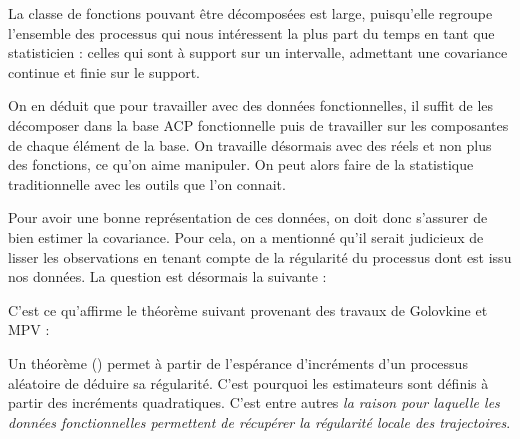 \begin{rem}
	La classe de fonctions pouvant être décomposées est large, puisqu'elle regroupe l'ensemble des processus qui nous intéressent la plus part du temps en tant que statisticien : celles qui sont à support sur un intervalle, admettant une covariance continue et finie sur le support.
\end{rem}

On en déduit que pour travailler avec des données fonctionnelles, il suffit de les décomposer dans la base ACP fonctionnelle puis de travailler sur les composantes de chaque élément de la base. On travaille désormais avec des réels et non plus des fonctions, ce qu'on aime manipuler. On peut alors faire de la statistique traditionnelle avec les outils que l'on connait.


\begin{propriete*}
	\noindent{}
\end{propriete*}

Pour avoir une bonne représentation de ces données, on doit donc s'assurer de bien estimer la covariance. Pour cela, on a mentionné qu'il serait judicieux de lisser les observations en tenant compte de la régularité du processus dont est issu nos données. La question est désormais la suivante :


C'est ce qu'affirme le théorème suivant provenant des travaux de Golovkine et MPV :

\begin{thm*}
	\noindent{}
	\label{thm*:regularite_locale}
\end{thm*}
\begin{rem}
	Un théorème () permet à partir de l'espérance d'incréments d'un processus aléatoire de déduire sa régularité.
	C'est pourquoi les estimateurs sont définis à partir des incréments quadratiques. C'est entre autres \emph{la raison pour laquelle les données fonctionnelles permettent de récupérer la régularité locale des trajectoires}.

	\label{rem:kolmo_continuite}
\end{rem}